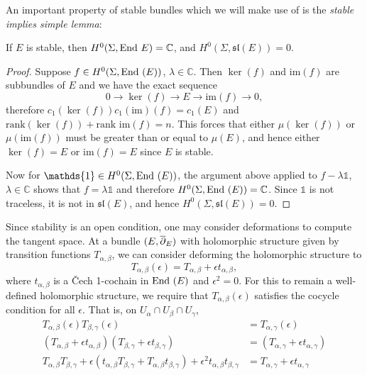 	An important property of stable bundles which we will make use of is the \emph{stable implies simple lemma}:
	\begin{lemma}
		If $E$ is stable, then $H^0(\Sigma,\text{End } E) = \mathbb{C}$, and $H^0(\Sigma,\mathfrak{sl}(E)) = 0$.
		\label{l:stablesimple}
	\end{lemma}
	\begin{proof}
		Suppose $f\in H^0(\Sigma,\text{End }(E))$, $\lambda \in \mathbb{C}$. Then $\ker(f)$ and im$(f)$ are subbundles of $E$ and we have the exact sequence
		\begin{equation}
			0\to \ker(f) \to E \to \text{im}(f)\to 0,
		\end{equation}
		therefore $c_1(\ker(f))c_1(\text{im})(f) = c_1(E)$ and $\text{rank}(\ker(f)) + \text{rank im}(f) = n$. This forces that either $\mu(\ker(f))$ or $\mu(\text{im}(f))$ must be greater than or equal to $\mu(E)$, and hence either $\ker(f) = E$ or $\text{im}(f)=E$ since $E$ is stable.
		
		Now for $\mathds{1}\in H^0(\Sigma,\End(E))$, the argument above applied to $f-\lambda \mathds{1}$, $\lambda \in \mathbb{C}$ shows that $f = \lambda \mathds{1}$ and therefore $H^0(\Sigma,\text{End }(E)) =\mathbb{C}$. Since $\mathds{1}$ is not traceless, it is not in $\mathfrak{sl}(E)$, and hence $H^0(\Sigma,\mathfrak{sl}(E)) =0$.
	\end{proof}
	Since stability is an open condition, one may consider deformations to compute the tangent space. At a bundle $(E,\overline{\partial}_E)$ with holomorphic structure given by transition functions $T_{\alpha,\beta}$, we can consider deforming the holomorphic structure to 
	\begin{equation}
	T_{\alpha,\beta}(\epsilon) = T_{\alpha,\beta} + \epsilon t_{\alpha,\beta},
	\end{equation}
	where $t_{\alpha,\beta}$ is a Čech 1-cochain in $\text{End }(E)$ and $\epsilon^2=0$. For this to remain a well-defined holomorphic structure, we require that $T_{\alpha,\beta}(\epsilon)$ satisfies the cocycle condition for all $\epsilon$. That is, on $U_{\alpha}\cap U_{\beta}\cap U_{\gamma}$,
	\begin{align*}
	T_{\alpha,\beta}(\epsilon)T_{\beta,\gamma}(\epsilon) &= T_{\alpha,\gamma}(\epsilon)\\
	\left(T_{\alpha,\beta} + \epsilon t_{\alpha,\beta} \right)
	\left(T_{\beta,\gamma} + \epsilon t_{\beta,\gamma} \right) &=
	\left(T_{\alpha,\gamma} + \epsilon t_{\alpha,\gamma} \right)\\
	T_{\alpha,\beta}T_{\beta,\gamma} + \epsilon(t_{\alpha,\beta}T_{\beta,\gamma} + T_{\alpha,\beta} t_{\beta,\gamma}) + \epsilon^2 t_{\alpha,\beta}t_{\beta,\gamma} &= T_{\alpha,\gamma} + \epsilon t_{\alpha,\gamma}
	\end{align*}
